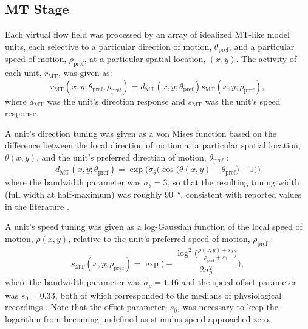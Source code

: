 \subsection{MT Stage}
\label{sec:MSTd|methods|MT}
Each virtual flow field was processed by an array of idealized \ac{MT}-like 
model units, each selective to a particular direction of motion, 
$\theta_{\textrm{pref}}$, and a particular speed of motion, 
$\rho_{\textrm{pref}}$, at a particular spatial location, $(x,y)$. 
The activity of each unit, $r_{\textrm{MT}}$, was given as:
\begin{equation}
r_{\textrm{MT}}(x,y;\theta_{\textrm{pref}},\rho_{\textrm{pref}}) = d_{\textrm{MT}} (x,y;\theta_{\textrm{pref}}) s_{\textrm{MT}}(x,y;\rho_{\textrm{pref}}), \label{sec:MSTd|methods|rMT}
\end{equation}
where $d_{\textrm{MT}}$ was the unit's direction response and $s_{\textrm{MT}}$
was the unit's speed response. 

A unit's direction tuning was given as a von Mises function based on the 
difference between the local direction of motion at a particular spatial 
location, $\theta(x,y)$, and the unit's preferred direction of motion, 
$\theta_{\textrm{pref}}$ \citep{Mardia1972,Swindale1998,JazayeriMovshon2006}:
\begin{equation}
d_{\textrm{MT}} (x, y; \theta_{\textrm{pref}}) = \exp⁡ \bigg( \sigma_\theta \Big( \cos \big( \theta(x, y) - \theta_{\textrm{pref}} \big) - 1 \Big) \bigg) \label{sec:MSTd|methods|dMT}
\end{equation}
where the bandwidth parameter was $\sigma_\theta=3$, so that the resulting 
tuning width (full width at half-maximum) was roughly \SI{90}{\degree}, 
consistent with reported values in the literature \citep{BrittenNewsome1998}.

A unit's speed tuning was given as a log-Gaussian function of the local speed
of motion, $\rho(x,y)$, relative to the unit's preferred speed of motion, 
$\rho_{\textrm{pref}}$ \citep{Nover2005}:
\begin{equation}
s_{\textrm{MT}} (x, y; \rho_{\textrm{pref}}) = \exp⁡ \Bigg( -\frac{\log^2⁡ \Big( \frac{\rho(x,y) + s_0}{\rho_{\textrm{pref}} + s_0} \Big)}{2\sigma_\rho^2} \Bigg), \label{eqn:MSTd|methods|sMT}
\end{equation}
where the bandwidth parameter was $\sigma_\rho=1.16$ and the speed offset 
parameter was $s_0=0.33$, both of which corresponded to the medians of 
physiological recordings \citep{Nover2005}. Note that the offset parameter, 
$s_0$, was necessary to keep the logarithm from becoming undefined as 
stimulus speed approached zero.

